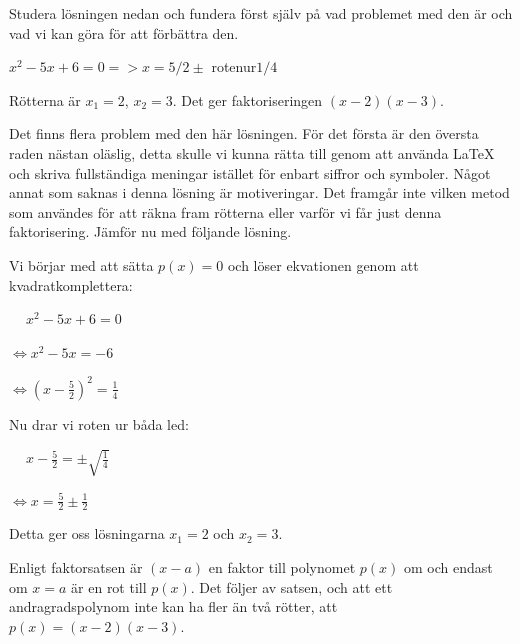 \documentclass[titlepage]{article}
\begin{document}
Studera lösningen nedan och fundera först själv på vad problemet med den är och vad vi kan göra för att förbättra den.

\begin{center}
\begin{tcolorbox}[width=\linewidth,colback={red!15!white},title={\textbf{Lösning 1 - Sämre}},outer arc=0mm,colupper=black]
    $x^2-5x+6 = 0 => x=5/2 \pm$ rotenur$1/4$

    Rötterna är $x_1 = 2$, $x_2 = 3$. Det ger faktoriseringen $(x-2)(x-3)$.
\end{tcolorbox} 
\end{center}

Det finns flera problem med den här lösningen. För det första är den översta raden nästan oläslig, detta skulle vi kunna rätta till genom att använda \LaTeX$\:$ och skriva fullständiga meningar istället för enbart siffror och symboler. Något annat som saknas i denna lösning är motiveringar. Det framgår inte vilken metod som användes för att räkna fram rötterna eller varför vi får just denna faktorisering. Jämför nu med följande lösning.

\begin{center}
\begin{tcolorbox}[width=\linewidth,colback={green!25!white},title={\textbf{Lösning 2 - Bättre}},outer arc=0mm,colupper=black]    
    Vi börjar med att sätta $p(x)=0$ och löser ekvationen genom att kvadratkomplettera:
    \vspace{2mm}

    $\quad \: x^2-5x+6 = 0$

    $\Leftrightarrow x^2-5x = -6$

    $\Leftrightarrow(x-\frac{5}{2})^2 = \frac{1}{4}$
    \vspace{2mm}

    Nu drar vi roten ur båda led:
    \vspace{2mm}

    $\quad \: x-\frac{5}{2} = \pm \sqrt{\frac{1}{4}}$

    $\Leftrightarrow x = \frac{5}{2} \pm \frac{1}{2}$
    \vspace{2mm}

    Detta ger oss lösningarna $x_1 = 2$ och $x_2=3$.

    Enligt faktorsatsen är $(x-a)$ en faktor till polynomet $p(x)$ om och endast om $x = a$ är en rot till $p(x)$. Det följer av satsen, och att ett andragradspolynom inte kan ha fler än två rötter, att $p(x) = (x-2)(x-3)$.
\end{tcolorbox} 
\end{center}
\end{document}

